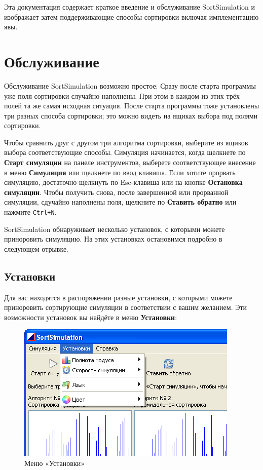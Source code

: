 \documentclass[11pt, a4paper, titlepage, twoside]{article}
\renewcommand{\emph}{\textbf}
\begin{document}
	Эта документация содержает краткое введение и обслуживание SortSimulation и изображает затем поддерживающие способы сортировки включая имплементацию явы.
	
	\section{Обслуживание}
	
	Обслуживание SortSimulation возможно простое: Сразу после старта программы уже поля сортировки случайно наполнены. При этом в каждом из этих трёх полей та же самая исходная ситуация. После старта программы тоже установлены три разных способа сортировки; это можно видеть на ящиках выбора под полями сортировки.
	
	Чтобы сравнить друг с другом три алгоритма сортировки, выберите из ящиков выбора соответствующие способы. Симуляция начинается, когда щелкнете по \emph{Старт симуляции} на панеле инструментов, выберете соответствующее внесение в меню \emph{Симуляция} или щелкнете по ввод клавиша. Если хотите прорвать симуляцию, достаточно щелкнуть по Esc-клавиша или на кнопке \emph{Остановка симуляции}. Чтобы получить снова, после завершенной или прорванной симуляции, сдучайно наполнены поля, щелкните по \emph{Ставить обратно} или нажмите \texttt{Ctrl+N}.
	
	SortSimulation обнаруживает несколько установок, с которыми можете приноровить симуляцию. На этих установках остановимся подробно в следующем отрывке.
	
	\subsection{Установки}
	
	Для вас находятся в распоряжении разные установки, с которыми можете приноровить сортирующие симуляции в соответствии с вашим желанием. Эти возможности установок вы найдёте в меню \emph{Установки}:
	
	\begin{figure}[h]
		\begin{center}
			\includegraphics[scale=0.6]{images/image1.png}
			\caption{Меню «Установки»}
		\end{center}
	\end{figure}
	
\end{document}
